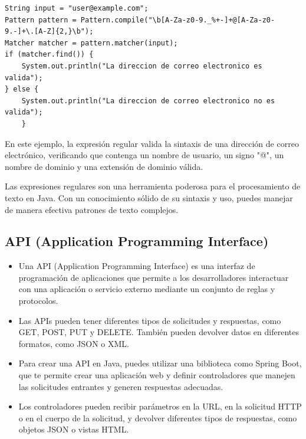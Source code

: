 \documentclass[executivepaper]{article}
\begin{document}
\begin{lstlisting}
String input = "user@example.com";
Pattern pattern = Pattern.compile("\b[A-Za-z0-9._%+-]+@[A-Za-z0-9.-]+\.[A-Z]{2,}\b");
Matcher matcher = pattern.matcher(input);
if (matcher.find()) {
    System.out.println("La direccion de correo electronico es valida");
} else {
    System.out.println("La direccion de correo electronico no es valida");
    }
\end{lstlisting}

En este ejemplo, la expresión regular valida la sintaxis de una dirección de correo electrónico, verificando que contenga un nombre de usuario, un signo "@", un nombre de dominio y una extensión de dominio válida.

Las expresiones regulares son una herramienta poderosa para el procesamiento de texto en Java. Con un conocimiento sólido de su sintaxis y uso, puedes manejar de manera efectiva patrones de texto complejos.

\subsection{API (Application Programming Interface)}
\begin{itemize}
    \item Una API (Application Programming Interface) es una interfaz de programación de aplicaciones que permite a los desarrolladores interactuar con una aplicación o servicio externo mediante un conjunto de reglas y protocolos.
    \item Las APIs pueden tener diferentes tipos de solicitudes y respuestas, como GET, POST, PUT y DELETE. También pueden devolver datos en diferentes formatos, como JSON o XML.
    \item Para crear una API en Java, puedes utilizar una biblioteca como Spring Boot, que te permite crear una aplicación web y definir controladores que manejen las solicitudes entrantes y generen respuestas adecuadas.
    \item Los controladores pueden recibir parámetros en la URL, en la solicitud HTTP o en el cuerpo de la solicitud, y devolver diferentes tipos de respuestas, como objetos JSON o vistas HTML.
    \end{itemize}
\end{document}
